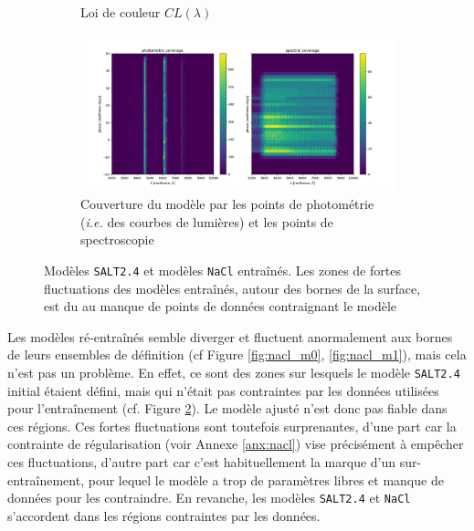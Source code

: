 \documentclass{book}
\def\nacl{\texttt{NaCl}\xspace}
\def\saltd{\texttt{SALT2.4}\xspace}
\begin{document}
\begin{figure}[h]
\begin{subfigure}[c]{0.35\textwidth}
		\caption{Loi de couleur $CL(\lambda)$}
		\label{fig:nacl_cl}
	\end{subfigure}
	\hfill
	\begin{subfigure}[c]{0.6\textwidth}
		\centering
		\includegraphics[width=\textwidth]{figures/nacl_coverage.png}
		\caption{Couverture du modèle par les points de photométrie (\textit{i.e.} des courbes de lumières) et les points de spectroscopie}
		\label{fig:nacl_coverage}
	\end{subfigure}

	\caption{Modèles \saltd et modèles \nacl entraînés. Les zones de fortes fluctuations des modèles entraînés, autour des bornes de la surface, est du au manque de points de données contraignant le modèle}
	\label{fig:nacl_models}
\end{figure}

Les modèles ré-entraînés semble diverger et fluctuent anormalement aux bornes de leurs ensembles de définition (cf Figure \ref{fig:nacl_m0}, \ref{fig:nacl_m1}), mais cela n'est pas un problème. En effet, ce sont des zones sur lesquels le modèle \saltd initial étaient défini, mais qui n'était pas contraintes par les données utilisées pour l'entraînement (cf. Figure \ref{fig:nacl_coverage}). Le modèle ajusté n'est donc pas fiable dans ces régions. Ces fortes fluctuations sont toutefois surprenantes, d'une part car la contrainte de régularisation (voir Annexe \ref{anx:nacl}) vise précisément à empêcher ces fluctuations, d'autre part car c'est habituellement la marque d'un sur-entraînement, pour lequel le modèle a trop de paramètres libres et manque de données pour les contraindre. En revanche, les modèles \saltd et \nacl s'accordent dans les régions contraintes par les données.
\end{document}
